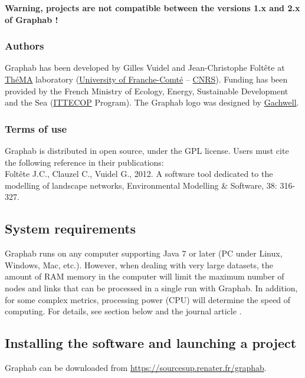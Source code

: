 \documentclass{article}
\begin{document}
\textbf{Warning, projects are not compatible between the versions 1.x and 2.x of Graphab !}

\subsubsection{Authors}

Graphab has been developed by Gilles Vuidel and Jean-Christophe Foltête at \href{http://thema.univ-fcomte.fr/}{ThéMA} laboratory (\href{http://www.univ-fcomte.fr}{University of Franche-Comté} – \href{http://www.cnrs.fr}{CNRS}). Funding has been provided by the French Ministry of Ecology, Energy, Sustainable Development and the Sea (\href{http://www.ittecop.fr/}{ITTECOP} Program). The Graphab logo was designed by \href{http://www.gachwell.com/}{Gachwell}.

\subsubsection{Terms of use}

Graphab is distributed in open source, under the GPL license. Users must cite the following reference \cite{2012_graphab_EMS} in their publications:\\
Foltête J.C., Clauzel C., Vuidel G., 2012. A software tool dedicated to the modelling of landscape networks, Environmental Modelling \& Software, 38: 316-327.


\subsection{System requirements}

Graphab runs on any computer supporting Java 7 or later (PC under Linux, Windows, Mac, etc.). However, when dealing with very large datasets, the amount of RAM memory in the computer will limit the maximum number of nodes and links that can be processed in a single run with Graphab. In addition, for some complex metrics, processing power (CPU) will determine the speed of computing. For details, see section  below and the journal article  \cite{2012_graphab_EMS}.

\subsection{Installing the software and launching a project}

Graphab can be downloaded from \url{https://sourcesup.renater.fr/graphab}.
\end{document}
